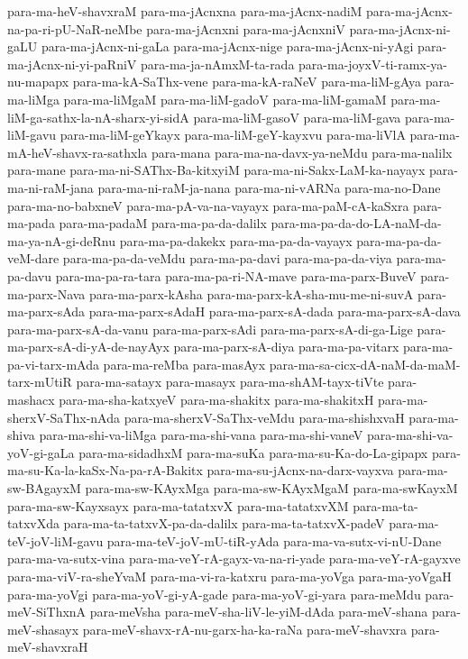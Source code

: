 {para-ma-heV-shavxraM
para-ma-jAcnxna
para-ma-jAcnx-nadiM
para-ma-jAcnx-na-pa-ri-pU-NaR-neMbe
para-ma-jAcnxni
para-ma-jAcnxniV
para-ma-jAcnx-ni-gaLU
para-ma-jAcnx-ni-gaLa
para-ma-jAcnx-nige
para-ma-jAcnx-ni-yAgi
para-ma-jAcnx-ni-yi-paRniV
para-ma-ja-nAmxM-ta-rada
para-ma-joyxV-ti-ramx-ya-nu-mapapx
para-ma-kA-SaThx-vene
para-ma-kA-raNeV
para-ma-liM-gAya
para-ma-liMga
para-ma-liMgaM
para-ma-liM-gadoV
para-ma-liM-gamaM
para-ma-liM-ga-sathx-la-nA-sharx-yi-sidA
para-ma-liM-gasoV
para-ma-liM-gava
para-ma-liM-gavu
para-ma-liM-geYkayx
para-ma-liM-geY-kayxvu
para-ma-liVlA
para-ma-mA-heV-shavx-ra-sathxla
para-mana
para-ma-na-davx-ya-neMdu
para-ma-nalilx
para-mane
para-ma-ni-SAThx-Ba-kitxyiM
para-ma-ni-Sakx-LaM-ka-nayayx
para-ma-ni-raM-jana
para-ma-ni-raM-ja-nana
para-ma-ni-vARNa
para-ma-no-Dane
para-ma-no-babxneV
para-ma-pA-va-na-vayayx
para-ma-paM-cA-kaSxra
para-ma-pada
para-ma-padaM
para-ma-pa-da-dalilx
para-ma-pa-da-do-LA-naM-da-ma-ya-nA-gi-deRnu
para-ma-pa-dakekx
para-ma-pa-da-vayayx
para-ma-pa-da-veM-dare
para-ma-pa-da-veMdu
para-ma-pa-davi
para-ma-pa-da-viya
para-ma-pa-davu
para-ma-pa-ra-tara
para-ma-pa-ri-NA-mave
para-ma-parx-BuveV
para-ma-parx-Nava
para-ma-parx-kAsha
para-ma-parx-kA-sha-mu-me-ni-suvA
para-ma-parx-sAda
para-ma-parx-sAdaH
para-ma-parx-sA-dada
para-ma-parx-sA-dava
para-ma-parx-sA-da-vanu
para-ma-parx-sAdi
para-ma-parx-sA-di-ga-Lige
para-ma-parx-sA-di-yA-de-nayAyx
para-ma-parx-sA-diya
para-ma-pa-vitarx
para-ma-pa-vi-tarx-mAda
para-ma-reMba
para-masAyx
para-ma-sa-cicx-dA-naM-da-maM-tarx-mUtiR
para-ma-satayx
para-masayx
para-ma-shAM-tayx-tiVte
para-mashacx
para-ma-sha-katxyeV
para-ma-shakitx
para-ma-shakitxH
para-ma-sherxV-SaThx-nAda
para-ma-sherxV-SaThx-veMdu
para-ma-shishxvaH
para-ma-shiva
para-ma-shi-va-liMga
para-ma-shi-vana
para-ma-shi-vaneV
para-ma-shi-va-yoV-gi-gaLa
para-ma-sidadhxM
para-ma-suKa
para-ma-su-Ka-do-La-gipapx
para-ma-su-Ka-la-kaSx-Na-pa-rA-Bakitx
para-ma-su-jAcnx-na-darx-vayxva
para-ma-sw-BAgayxM
para-ma-sw-KAyxMga
para-ma-sw-KAyxMgaM
para-ma-swKayxM
para-ma-sw-Kayxsayx
para-ma-tatatxvX
para-ma-tatatxvXM
para-ma-ta-tatxvXda
para-ma-ta-tatxvX-pa-da-dalilx
para-ma-ta-tatxvX-padeV
para-ma-teV-joV-liM-gavu
para-ma-teV-joV-mU-tiR-yAda
para-ma-va-sutx-vi-nU-Dane
para-ma-va-sutx-vina
para-ma-veY-rA-gayx-va-na-ri-yade
para-ma-veY-rA-gayxve
para-ma-viV-ra-sheYvaM
para-ma-vi-ra-katxru
para-ma-yoVga
para-ma-yoVgaH
para-ma-yoVgi
para-ma-yoV-gi-yA-gade
para-ma-yoV-gi-yara
para-meMdu
para-meV-SiThxnA
para-meVsha
para-meV-sha-liV-le-yiM-dAda
para-meV-shana
para-meV-shasayx
para-meV-shavx-rA-nu-garx-ha-ka-raNa
para-meV-shavxra
para-meV-shavxraH
}
